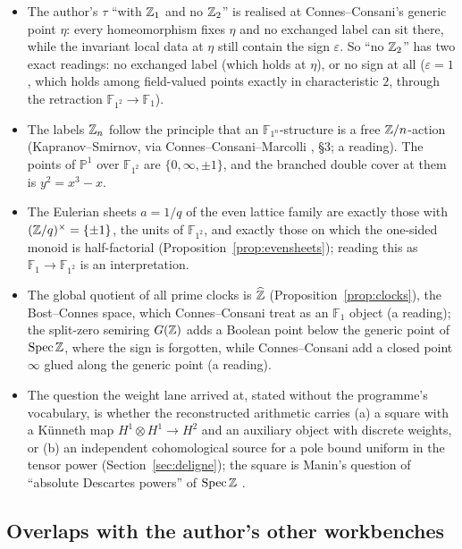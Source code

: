 \begin{itemize}
\item The author's $\tau$ ``with $\mathbb{Z}_1$ and no $\mathbb{Z}_2$'' is realised at Connes--Consani's generic point $\eta$: every homeomorphism fixes $\eta$ and no exchanged label can sit there, while the invariant local data at $\eta$ still contain the sign $\varepsilon$. So ``no $\mathbb{Z}_2$'' has two exact readings: no exchanged label (which holds at $\eta$), or no sign at all ($\varepsilon=1$, which holds among field-valued points exactly in characteristic $2$, through the retraction $\mathbb{F}_{1^2}\to\mathbb{F}_1$).
\item The labels $\mathbb{Z}_n$ follow the principle that an $\mathbb{F}_{1^n}$-structure is a free $\mathbb{Z}/n$-action (Kapranov--Smirnov, via Connes--Consani--Marcolli \cite{CCMfun}, §3; a reading). The points of $\mathbb{P}^1$ over $\mathbb{F}_{1^2}$ are $\{0,\infty,\pm1\}$, and the branched double cover at them is $y^2=x^3-x$.
\item The Eulerian sheets $a=1/q$ of the even lattice family are exactly those with $(\mathbb{Z}/q)^\times=\{\pm1\}$, the units of $\mathbb{F}_{1^2}$, and exactly those on which the one-sided monoid is half-factorial (Proposition~\ref{prop:evensheets}); reading this as $\mathbb{F}_1\to\mathbb{F}_{1^2}$ is an interpretation.
\item The global quotient of all prime clocks is $\widehat{\mathbb{Z}}$ (Proposition~\ref{prop:clocks}), the Bost--Connes space, which Connes--Consani treat as an $\mathbb{F}_1$ object (a reading); the split-zero semiring $G(\mathbb{Z})$ adds a Boolean point below the generic point of $\operatorname{Spec}\mathbb{Z}$, where the sign is forgotten, while Connes--Consani add a closed point $\infty$ glued along the generic point (a reading).
\item The question the weight lane arrived at, stated without the programme's vocabulary, is whether the reconstructed arithmetic carries (a) a square with a Künneth map $H^1\otimes H^1\to H^2$ and an auxiliary object with discrete weights, or (b) an independent cohomological source for a pole bound uniform in the tensor power (Section~\ref{sec:deligne}); the square is Manin's question of ``absolute Descartes powers'' of $\operatorname{Spec}\mathbb{Z}$ \cite{Manin}.
\end{itemize}

\subsection{Overlaps with the author's other workbenches}\label{ssec:overlaps}

